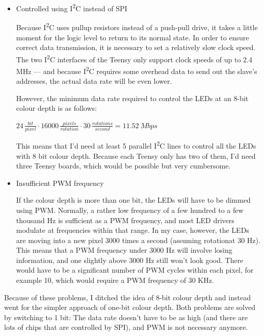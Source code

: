 \documentclass[a4paper, 11pt, titlepage]{report}
\def \itwoc {I\textsuperscript{2}C\xspace}
\newenvironment{ownmath}
{\vspace{2mm}\hspace{15pt}\begin{math}}
{\end{math}\vspace{2mm}}
\begin{document}
\begin{itemize}

\item Controlled using \itwoc  instead of SPI

Because \itwoc uses pullup resistors instead of a push-pull drive, it takes a little moment for
the logic level to return to its normal state. In order to ensure correct data transmission, it is
necessary to set a relatively slow clock speed. The two \itwoc interfaces of the Teensy only
support clock speeds of up to 2.4 MHz --- and because \itwoc requires some overhead data to send
out the slave's addresses, the actual data rate will be even lower.

However, the minimum data rate required to control the LEDs at an 8-bit colour depth is as follows:

\begin{ownmath}
24\,\frac{\si{bit}}{\si{pixel}} \cdot 16000\,\frac{\si{pixels}}{\si{rotation}} \cdot
30\,\frac{\si{rotations}}{\si{second}} = \SI{11.52}{Mbps} 
\end{ownmath}

This means that I'd need at least 5 parallel \itwoc lines to control all the LEDs with 8 bit colour
depth. Because each Teensy only has two of them, I'd need three Teensy boards, which would be
possible but very cumbersome.

\item Insufficient PWM frequency

If the colour depth is more than one bit, the LEDs will have to be dimmed using PWM. Normally, a
rather low frequency of a few hundred to a few thousand Hz is sufficient as a PWM frequency, and
most LED drivers modulate at frequencies within that range. In my case, however, the LEDs are
moving into a new pixel 3000 times a second (assuming rotationat 30 Hz). This means that a PWM
frequency under 3000 Hz will involve losing information, and one slightly above 3000 Hz still
won't look good. There would have to be a significant number of PWM cycles within each pixel,
for example 10, which would require a PWM frequency of 30 KHz.

\end{itemize}

Because of these problems, I ditched the idea of 8-bit colour depth and instead went for the
simpler approach of one-bit colour depth. Both problems are solved by switching to 1 bit: The data
rate doesn't have to be as high (and there are lots of chips that are controlled by SPI), and PWM
is not necessary anymore.
\end{document}
